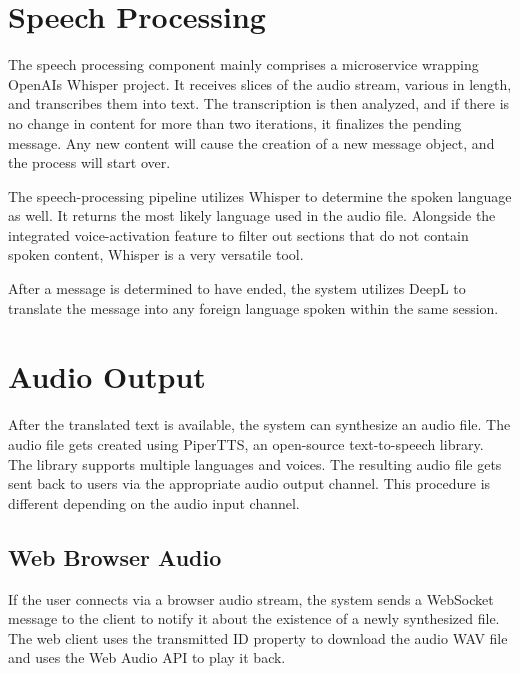 
\section{Speech Processing}

The speech processing component mainly comprises a microservice wrapping OpenAIs Whisper project. It receives slices of 
the audio stream, various in length, and transcribes them into text. The transcription is then analyzed, and if there 
is no change in content for more than two iterations, it finalizes the pending message. Any new content will cause the 
creation of a new message object, and the process will start over.

The speech-processing pipeline utilizes Whisper to determine the spoken language as well. It returns the most likely 
language used in the audio file. Alongside the integrated voice-activation feature to filter out sections that do not 
contain spoken content, Whisper is a very versatile tool.

After a message is determined to have ended, the system utilizes DeepL to translate the message into any foreign 
language spoken within the same session.


\section{Audio Output}

After the translated text is available, the system can synthesize an audio file. The audio file gets created 
using PiperTTS, an open-source text-to-speech library. The library supports multiple languages and voices. The 
resulting audio file gets sent back to users via the appropriate audio output channel. This procedure is different 
depending on the audio input channel.

\subsection{Web Browser Audio}

If the user connects via a browser audio stream, the system sends a WebSocket message to the client to notify it about 
the existence of a newly synthesized file. The web client uses the transmitted ID property to download the audio WAV 
file and uses the Web Audio API to play it back.

